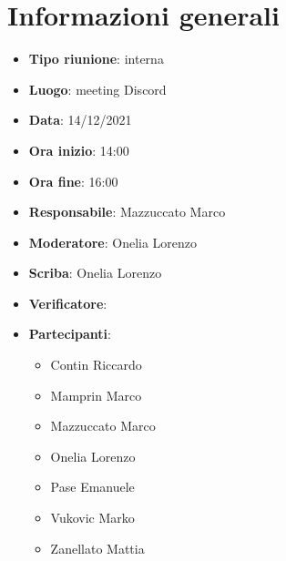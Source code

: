 \section{Informazioni generali}
\begin{itemize}
  \item \textbf{Tipo riunione}: interna
  \item \textbf{Luogo}: meeting Discord
  \item \textbf{Data}: 14/12/2021
  \item \textbf{Ora inizio}: 14:00
  \item \textbf{Ora fine}: 16:00
  \item \textbf{Responsabile}: Mazzuccato Marco
  \item \textbf{Moderatore}: Onelia Lorenzo
  \item \textbf{Scriba}: Onelia Lorenzo
  \item \textbf{Verificatore}:
  \item \textbf{Partecipanti}:
  \begin{itemize}
    \item Contin Riccardo
    \item Mamprin Marco
    \item Mazzuccato Marco
    \item Onelia Lorenzo
    \item Pase Emanuele
    \item Vukovic Marko
    \item Zanellato Mattia
  \end{itemize}
\end{itemize}
